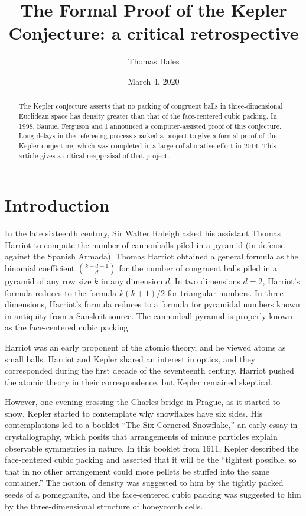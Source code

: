 \documentclass{amsart}
\title{The Formal Proof of the Kepler Conjecture: a critical retrospective}
\author{Thomas Hales}
\date{}
\date{March 4, 2020}
\begin{document}
\maketitle

\begin{abstract} 
  The Kepler conjecture asserts that no packing of congruent balls in
  three-dimensional Euclidean space has density greater than that of the
  face-centered cubic packing.  In 1998, Samuel Ferguson and I
  announced a computer-assisted proof of this conjecture.  Long delays
  in the refereeing process sparked a project to give a formal proof
  of the Kepler conjecture, which was completed in a large
  collaborative effort in 2014.  This article gives a critical
  reappraisal of that project.
\end{abstract}

\baselineskip
{}\baselineskip

\newenvironment{blockquote}{%
  \par%
  \medskip%
  \baselineskip=0.7\baselineskip%
  \leftskip=2em\rightskip=2em%
  \noindent\ignorespaces}{%
  \par\medskip}

\section{Introduction}

In the late sixteenth century, Sir Walter Raleigh asked his assistant
Thomas Harriot to compute the number of cannonballs piled in a pyramid
(in defense against the Spanish Armada).  Thomas Harriot obtained a
general formula as the binomial coefficient ${k+d-1\choose d}$ for the
number of congruent balls piled in a pyramid of any row size $k$ in
any dimension $d$.  In two dimensions $d=2$, Harriot's formula reduces
to the formula $k(k+1)/2$ for triangular numbers.  In three
dimensions, Harriot's formula reduces to a formula for pyramidal
numbers known in antiquity from a Sanskrit source.  The cannonball
pyramid is properly known as the face-centered cubic packing.

Harriot was an early proponent of the atomic theory, and he viewed
atoms as small balls.  Harriot and Kepler shared an interest in optics, and
they corresponded during the first decade of the seventeenth century.
Harriot pushed the atomic theory in their correspondence, but Kepler
remained skeptical.

However, one evening crossing the Charles bridge in Prague, as it
started to snow, Kepler started to contemplate why snowflakes have six
sides.  His contemplations led to a booklet ``The Six-Cornered
Snowflake,'' an early essay in crystallography, which posits that
arrangements of minute particles explain observable
symmetries in nature.  In this booklet from 1611, Kepler
described the face-centered cubic packing and asserted that it will be
the ``tightest possible, so that in no other arrangement could more
pellets be stuffed into the same container.'' The notion of density was
suggested to him by the tightly packed seeds of a pomegranite, and the
face-centered cubic packing was suggested to him by the three-dimensional structure of
honeycomb cells.
\end{document}
